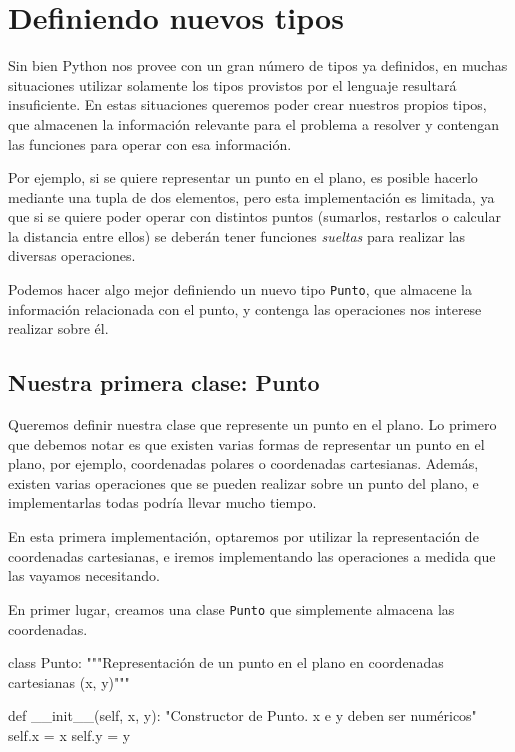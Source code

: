 \section{Definiendo nuevos tipos}

Sin bien Python nos provee con un gran número de tipos ya definidos, en
muchas situaciones utilizar solamente los tipos provistos por el lenguaje
resultará insuficiente.  En estas situaciones queremos poder crear nuestros
propios tipos, que almacenen la información relevante para el problema a
resolver y contengan las funciones para operar con esa información.

Por ejemplo, si se quiere representar un punto en el plano, es posible
hacerlo mediante una tupla de dos elementos, pero esta implementación es
limitada, ya que si se quiere poder operar con distintos puntos (sumarlos,
restarlos o calcular la distancia entre ellos) se deberán tener funciones
{\it sueltas} para realizar las diversas operaciones.

Podemos hacer algo mejor definiendo un nuevo tipo \lstinline!Punto!, que almacene
la información relacionada con el punto, y contenga las operaciones nos
interese realizar sobre él.

\subsection{Nuestra primera clase: Punto}

Queremos definir nuestra clase que represente un punto en el plano.
Lo primero que debemos notar es que existen varias formas de representar un
punto en el plano, por ejemplo, coordenadas polares o coordenadas
cartesianas.
Además, existen varias operaciones que se pueden realizar sobre un punto
del plano, e implementarlas todas podría llevar mucho tiempo.

En esta primera implementación, optaremos por utilizar la representación de
coordenadas cartesianas, e iremos implementando las operaciones a medida
que las vayamos necesitando.

En primer lugar, creamos una clase \lstinline!Punto! que simplemente
almacena las coordenadas.

\begin{codigo-python-sn}
class Punto:
    """Representación de un punto en el plano en
       coordenadas cartesianas (x, y)"""

    def __init__(self, x, y):
        "Constructor de Punto. x e y deben ser numéricos"
        self.x = x
        self.y = y
\end{codigo-python-sn}


